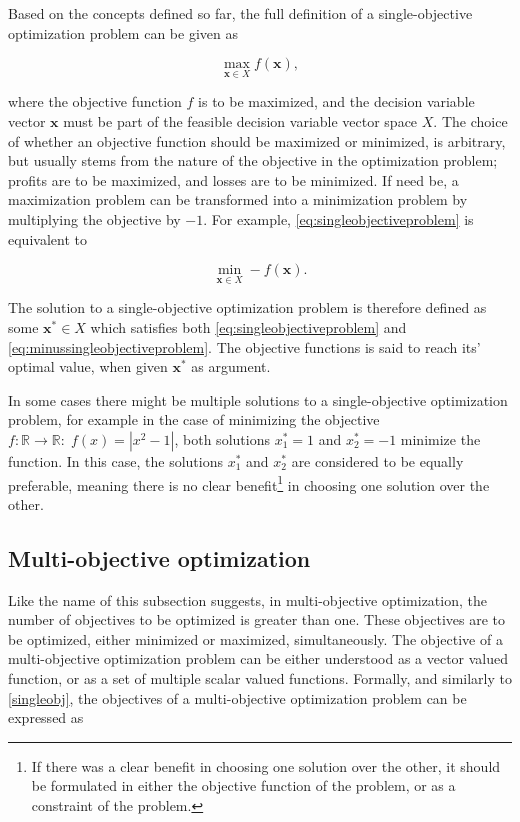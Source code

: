Based on the concepts defined so far, the full definition of a single-objective optimization problem can be given as

\begin{equation}
    \label{eq:singleobjectiveproblem}
    \max_{\mathbf{x}\in X} f(\mathbf{x}),
\end{equation}

where the objective function $f$ is to be maximized, and the decision variable vector $\mathbf{x}$ must be part of the feasible decision variable
vector space $X$. The choice of whether an objective function should be maximized or minimized, is arbitrary, but usually stems from the
nature of the objective in the optimization problem; profits are to be maximized, and losses are to be minimized. If need be, a maximization
problem can be transformed into a minimization problem by multiplying the objective by $-1$. For example, \eqref{eq:singleobjectiveproblem}
is equivalent to

\begin{equation}
    \label{eq:minussingleobjectiveproblem}
    \min_{\mathbf{x}\in X} -f(\mathbf{x}).
\end{equation}

The solution to a single-objective optimization problem is therefore defined as some $\mathbf{x^*}\in X$ which satisfies 
both \eqref{eq:singleobjectiveproblem} and \eqref{eq:minussingleobjectiveproblem}. The objective functions is said to reach its'
optimal value, when given $\mathbf{x^*}$ as argument.

In some cases there might be multiple solutions
to a single-objective optimization problem, for example in the case of minimizing the objective $f: \mathbb{R}\to\mathbb{R}:\;
f(x) = |x^2 - 1|$, both solutions
$x^*_1 = 1$ and $x^*_2 = -1$ minimize the function. In this case, the solutions $x^*_1$ and $x^*_2$
are considered to be equally preferable, meaning
there is no clear benefit\footnote{If there was a clear benefit in choosing one solution over the other,
it should be formulated in either the objective function of the problem,
or as a constraint of the problem.} in choosing one solution over the other.

\subsection{Multi-objective optimization}
\label{multiobj}
Like the name of this subsection suggests, in multi-objective optimization, the number of objectives to be optimized
is greater than one. These objectives are to be optimized, either minimized or maximized, simultaneously. The objective of a multi-objective
optimization problem can be either understood as a vector valued function, or as a set of multiple scalar valued functions. Formally,
and similarly to \eqref{singleobj}, the objectives of a multi-objective optimization problem can be expressed as

